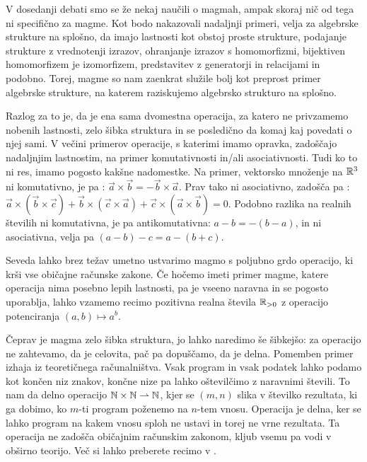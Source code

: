 V dosedanji debati smo se že nekaj naučili o magmah, ampak skoraj nič od tega ni specifično za magme. Kot bodo nakazovali nadaljnji primeri, velja za algebrske strukture na splošno, da imajo lastnosti kot obstoj proste strukture, podajanje strukture z vrednotenji izrazov, ohranjanje izrazov s homomorfizmi, bijektiven homomorfizem je izomorfizem, predstavitev z generatorji in relacijami in podobno. Torej, magme so nam zaenkrat služile bolj kot preprost primer algebrske strukture, na katerem raziskujemo algebrsko strukturo na splošno.

Razlog za to je, da je ena sama dvomestna operacija, za katero ne privzamemo nobenih lastnosti, zelo šibka struktura in se posledično da komaj kaj povedati o njej sami. V večini primerov operacije, s katerimi imamo opravka, zadoščajo nadaljnjim lastnostim, na primer komutativnosti in/ali asociativnosti. Tudi ko to ni res, imamo pogosto kakšne nadomestke. Na primer, vektorsko množenje na $\mathbb{R}^3$ ni komutativno, je pa : $\vec{a} \times \vec{b} = -\vec{b} \times \vec{a}$. Prav tako ni asociativno, zadošča pa : $\vec{a} \times (\vec{b} \times \vec{c}) + \vec{b} \times (\vec{c} \times \vec{a}) + \vec{c} \times (\vec{a} \times \vec{b}) = 0$. Podobno razlika na realnih številih ni komutativna, je pa antikomutativna: $a - b = -(b - a)$, in ni asociativna, velja pa $(a - b) - c = a - (b + c)$.

Seveda lahko brez težav umetno ustvarimo magmo s poljubno grdo operacijo, ki krši vse običajne računske zakone. Če hočemo imeti primer magme, katere operacija nima posebno lepih lastnosti, pa je vseeno naravna in se pogosto uporablja, lahko vzamemo recimo pozitivna realna števila $\mathbb{R}_{> 0}$ z operacijo potenciranja $(a, b) \mapsto a^b$.

Čeprav je magma zelo šibka struktura, jo lahko naredimo še šibkejšo: za operacijo ne zahtevamo, da je celovita, pač pa dopuščamo, da je delna. Pomemben primer  izhaja iz teoretičnega računalništva. Vsak program in vsak podatek lahko podamo kot končen niz znakov, končne nize pa lahko oštevilčimo z naravnimi števili. To nam da delno operacijo $\mathbb{N} \times \mathbb{N} \mathrel{\rightharpoonup} \mathbb{N}$, kjer se $(m, n)$ slika v številko rezultata, ki ga dobimo, ko $m$-ti program poženemo na $n$-tem vnosu. Operacija je delna, ker se lahko program na kakem vnosu sploh ne ustavi in torej ne vrne rezultata. Ta operacija ne zadošča običajnim računskim zakonom, kljub vsemu pa vodi v obširno teorijo. Več si lahko preberete recimo v .

